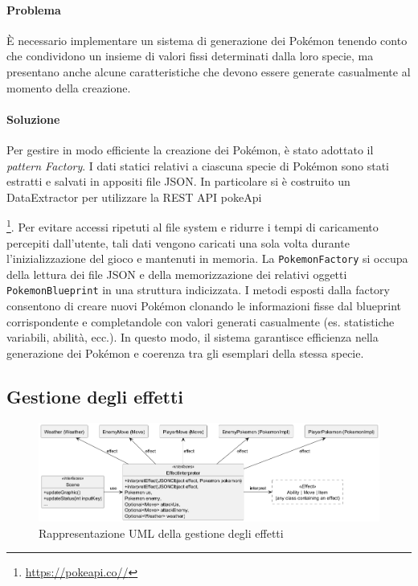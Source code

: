 \documentclass[a4paper,12pt]{report}
\begin{document}
{\paragraph{Problema}
È necessario implementare un sistema di generazione dei Pokémon tenendo conto che condividono un insieme di valori fissi determinati dalla loro specie, ma presentano anche alcune caratteristiche che devono essere generate casualmente al momento della creazione.

\paragraph{Soluzione} Per gestire in modo efficiente la creazione dei Pokémon, è stato adottato il \textit{pattern Factory}. I dati statici relativi a ciascuna specie di Pokémon sono stati estratti e salvati in appositi file JSON. In particolare si è costruito un DataExtractor per utilizzare la REST API pokeApi {\footnote{\url{https://pokeapi.co//}}. Per evitare accessi ripetuti al file system e ridurre i tempi di caricamento percepiti dall’utente, tali dati vengono caricati una sola volta durante l’inizializzazione del gioco e mantenuti in memoria. La \texttt{PokemonFactory} si occupa della lettura dei file JSON e della memorizzazione dei relativi oggetti \texttt{PokemonBlueprint} in una struttura indicizzata. I metodi esposti dalla factory consentono di creare nuovi Pokémon clonando le informazioni fisse dal blueprint corrispondente e completandole con valori generati casualmente (es. statistiche variabili, abilità, ecc.). In questo modo, il sistema garantisce efficienza nella generazione dei Pokémon e coerenza tra gli esemplari della stessa specie.
\subsection*{Gestione degli effetti}
\begin{figure}[H]
\centering{}
\includegraphics[width=\textwidth]{immagini/effectInterpreter.png}
\caption{Rappresentazione UML della gestione degli effetti}
\label{immagini/effectInterpreter}
\end{figure}
}}
\end{document}
